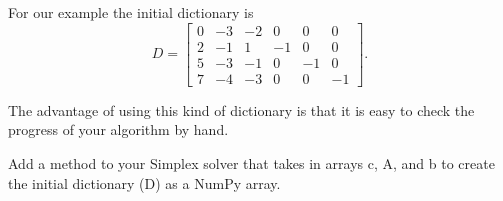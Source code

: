 For our example the initial dictionary is
\begin{equation*}
D = \begin{bmatrix}
    0 & -3 & -2 & 0 & 0 & 0\\
    2 & -1 & 1 & -1 & 0 & 0\\
    5 & -3 & -1 & 0 & -1 & 0\\
    7 & -4 & -3 & 0 & 0 & -1
    \end{bmatrix}.
\end{equation*}

The advantage of using this kind of dictionary is that it is easy to check the progress of your algorithm by hand.

\begin{problem} %
Add a method to your Simplex solver that takes in arrays c, A, and b to create the initial dictionary (D) as a NumPy array.
\label{prob:makedictionary}
\end{problem}

